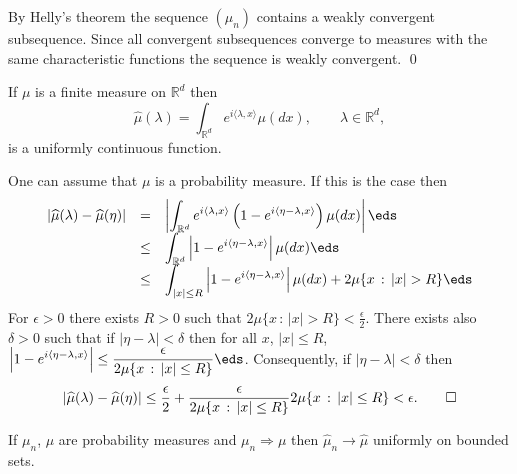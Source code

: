 \documentclass[preprint]{imsart}
\def\R{\mathbb R}
\def\ds{\displaystyle}
\begin{document}
{By Helly's theorem the sequence $(\mu_n)$ contains
a weakly convergent subsequence.
 Since
all convergent subsequences converge to measures with the same
characteristic functions the sequence is weakly convergent.
\qed



\begin{Proposition}
If $\mu $ is a finite measure on $\R^d$ then
$$
\widehat{\mu}(\lambda) = \int_{\R^d}
e^{i\langle \lambda ,x\rangle}\mu(dx),
\qquad \lambda\in\R^d,
$$
is a uniformly continuous function.
\end{Proposition}

One can assume that $\mu$ is a probability measure. If
this is the case then
$$
  \begin{array}{lll}
    | \widehat{\mu}(\lambda) - \widehat{\mu}(\eta)|& =
    & \ds
    \left|  \int_{\R^d}
e^{i\langle \lambda ,x\rangle}\left( 1- e^{i\langle
\eta -\lambda ,x\rangle}\right)
\mu(dx)\right|
\eds\\
      & \leq &\ds
       \int_{\R^d} \left| 1- e^{i\langle
\eta -\lambda ,x\rangle}\right|\mu(dx)
\eds\\
&\leq &\ds
\int_{|x|\leq R} \left| 1- e^{i\langle
\eta -\lambda ,x\rangle}\right|\mu(dx)
+2\mu\{ x\, :\, |x|>R\}
\eds
  \end{array}
$$
For $\epsilon >0$ there exists $R>0$ such that $2\mu\{
x\, :\, |x|>R\}<\frac{\epsilon}{2}$. There exists also
$\delta >0$ such that if $|\eta -\lambda |<\delta$ then
for all $x$, $|x|\leq R$, $\ds\left| 1- e^{i\langle
\eta -\lambda ,x\rangle}\right| \leq
\frac{\epsilon}{2\mu\{ x\, :\, |x|\leq R\}}\eds$.
Consequently, if $|\eta -\lambda |<\delta$ then
$$
| \widehat{\mu}(\lambda) - \widehat{\mu}(\eta)|
\leq \frac{\epsilon}{2}+
\frac{\epsilon}{2\mu\{ x\, :\, |x|\leq R\}}
2\mu\{ x\, :\, |x|\leq R\}< \epsilon .\qed
$$




\begin{Proposition}
If $\mu_n$, $\mu $ are probability measures and
$\mu_n\Rightarrow \mu $ then $\widehat{\mu}_n\to
\widehat{\mu}$ uniformly on bounded sets.
\end{Proposition}

}
\end{document}
